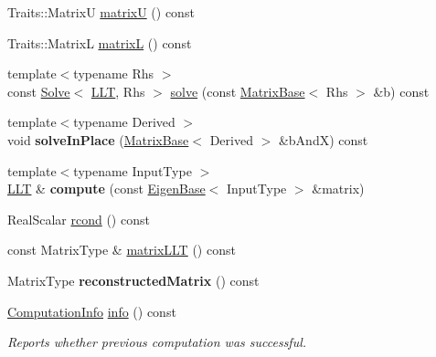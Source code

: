 \begin{DoxyCompactItemize}
Traits\+::\+MatrixU \hyperlink{group___cholesky___module_a18a390f085567e650e8345cc7e7c0df8}{matrixU} () const
\item 
Traits\+::\+MatrixL \hyperlink{group___cholesky___module_a7f4a3eedbf82e7ce2d6bf0dcd84cdfa3}{matrixL} () const
\item 
{\footnotesize template$<$typename Rhs $>$ }\\const \hyperlink{group___core___module_class_eigen_1_1_solve}{Solve}$<$ \hyperlink{group___cholesky___module_class_eigen_1_1_l_l_t}{L\+LT}, Rhs $>$ \hyperlink{group___cholesky___module_a3738bb3ce6f9b837a2beb432b937499f}{solve} (const \hyperlink{group___core___module_class_eigen_1_1_matrix_base}{Matrix\+Base}$<$ Rhs $>$ \&b) const
\item 
\mbox{\label{group___cholesky___module_a725d41e1a62d655bf87a5a76bd68b484}} 
{\footnotesize template$<$typename Derived $>$ }\\void {\bfseries solve\+In\+Place} (\hyperlink{group___core___module_class_eigen_1_1_matrix_base}{Matrix\+Base}$<$ Derived $>$ \&b\+AndX) const
\item 
\mbox{\label{group___cholesky___module_a047903df237859a988d8935ad3a02d0f}} 
{\footnotesize template$<$typename Input\+Type $>$ }\\\hyperlink{group___cholesky___module_class_eigen_1_1_l_l_t}{L\+LT} \& {\bfseries compute} (const \hyperlink{group___core___module_struct_eigen_1_1_eigen_base}{Eigen\+Base}$<$ Input\+Type $>$ \&matrix)
\item 
Real\+Scalar \hyperlink{group___cholesky___module_a59338fa78db171d02fd5a2c9e4f3a30c}{rcond} () const
\item 
const Matrix\+Type \& \hyperlink{group___cholesky___module_af62881fc95c7e54a93b63c20f2c62b46}{matrix\+L\+LT} () const
\item 
\mbox{\label{group___cholesky___module_ac23db13314b4323cfd177d08c8fb046a}} 
Matrix\+Type {\bfseries reconstructed\+Matrix} () const
\item 
\hyperlink{group__enums_ga85fad7b87587764e5cf6b513a9e0ee5e}{Computation\+Info} \hyperlink{group___cholesky___module_adb1295e7d2b1fd825a041345ae08be54}{info} () const
\begin{DoxyCompactList}\small\item\em Reports whether previous computation was successful. \end{DoxyCompactList}\item 

\end{DoxyCompactItemize}
